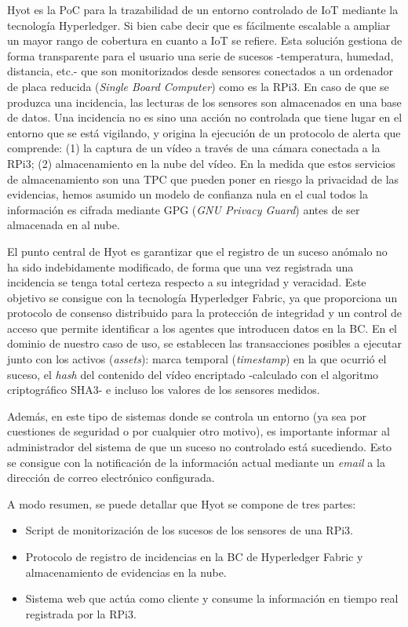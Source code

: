 \documentclass[10pt,conference,a4paper]{IEEEtran}
\begin{document}
Hyot es la PoC para la trazabilidad de un entorno controlado de IoT mediante la tecnología Hyperledger. Si bien cabe decir que es
fácilmente escalable a ampliar un mayor rango de cobertura en cuanto a
IoT se refiere. Esta solución gestiona de forma transparente para el
usuario una serie de sucesos -temperatura, humedad, distancia, etc.-
que son monitorizados desde sensores conectados a un ordenador de
placa reducida (\textit{Single Board Computer}) como es la RPi3. En caso de que se produzca una incidencia, las lecturas de los
sensores son almacenados en una base de datos. Una incidencia no es
sino una acción no controlada que tiene lugar en el entorno que se
está vigilando, y origina la ejecución de un protocolo de alerta que
comprende: (1) la captura de un vídeo a través de una cámara conectada
a la RPi3; (2) almacenamiento en la nube del vídeo. En la
medida que estos servicios de almacenamiento son una TPC que pueden
poner en riesgo la privacidad de las evidencias, hemos asumido un
modelo de confianza nula en el cual todos la información es cifrada
mediante  GPG (\textit{GNU Privacy Guard}) antes de ser almacenada en
al nube.

El punto central de Hyot es garantizar que el
registro de un  suceso anómalo no ha sido indebidamente
modificado, de forma que una vez registrada una incidencia se tenga
total certeza respecto a su integridad y veracidad. Este objetivo se
consigue con la tecnología Hyperledger Fabric, ya que proporciona un
protocolo de consenso distribuido para la protección de integridad y
un control de acceso que permite identificar a los agentes que
introducen datos en la BC. En el dominio de nuestro caso de uso, se establecen las transacciones posibles a ejecutar junto con
los activos (\textit{assets}): marca temporal (\textit{timestamp}) en
la que ocurrió el suceso, el \textit{hash} del contenido del vídeo
encriptado -calculado con el algoritmo criptográfico SHA3- e incluso
los valores de los sensores medidos.

Además, en este tipo de sistemas donde se controla un entorno (ya sea
por cuestiones de seguridad o por cualquier otro motivo), es importante
informar al administrador del sistema de que un suceso no
controlado está sucediendo. Esto se consigue con la notificación de la
información actual mediante un \textit{email} a la dirección de correo
electrónico configurada.

A modo resumen, se puede detallar que Hyot se compone de tres partes:

\begin{itemize}
  \item Script de monitorización de los sucesos de los sensores de una RPi3.
  \item Protocolo de registro de incidencias en la BC de Hyperledger
    Fabric y almacenamiento de evidencias en la nube. 
  \item Sistema web que actúa como cliente y consume la
          información en tiempo real registrada por la RPi3.
\end{itemize}
\end{document}
